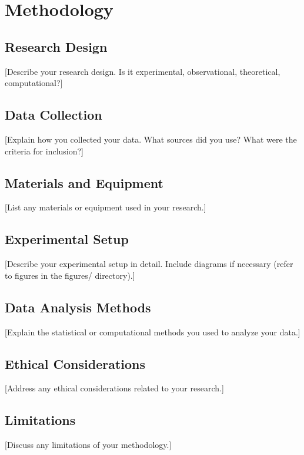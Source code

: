 
\section{Methodology}
\label{sec:methodology}

\subsection{Research Design}
[Describe your research design. Is it experimental, observational, theoretical, computational?]

\subsection{Data Collection}
[Explain how you collected your data. What sources did you use? What were the criteria for inclusion?]

\subsection{Materials and Equipment}
[List any materials or equipment used in your research.]

\subsection{Experimental Setup}
[Describe your experimental setup in detail. Include diagrams if necessary (refer to figures in the figures/ directory).]

\subsection{Data Analysis Methods}
[Explain the statistical or computational methods you used to analyze your data.]

\subsection{Ethical Considerations}
[Address any ethical considerations related to your research.]

\subsection{Limitations}
[Discuss any limitations of your methodology.]